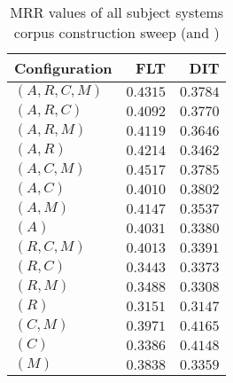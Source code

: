 
\begin{table}
\begin{spacing}{1.2}
\centering
\caption{MRR values of all subject systems corpus construction sweep (\cone and \ctwo)}
\label{table:all_corpus_sweep}
\vspace{0.2em}
\begin{tabular}{lrr}
\toprule
Configuration &           FLT &           DIT \\
\midrule
  $(A,R,C,M)$ &      $0.4315$ &      $0.3784$ \\
    $(A,R,C)$ &      $0.4092$ &      $0.3770$ \\
    $(A,R,M)$ &      $0.4119$ &      $0.3646$ \\
      $(A,R)$ &      $0.4214$ &      $0.3462$ \\
    $(A,C,M)$ & $\bm{0.4517}$ &      $0.3785$ \\
      $(A,C)$ &      $0.4010$ &      $0.3802$ \\
      $(A,M)$ &      $0.4147$ &      $0.3537$ \\
        $(A)$ &      $0.4031$ &      $0.3380$ \\
    $(R,C,M)$ &      $0.4013$ &      $0.3391$ \\
      $(R,C)$ &      $0.3443$ &      $0.3373$ \\
      $(R,M)$ &      $0.3488$ &      $0.3308$ \\
        $(R)$ &      $0.3151$ &      $0.3147$ \\
      $(C,M)$ &      $0.3971$ & $\bm{0.4165}$ \\
        $(C)$ &      $0.3386$ &      $0.4148$ \\
        $(M)$ &      $0.3838$ &      $0.3359$ \\
\bottomrule
\end{tabular}

\end{spacing}
\end{table}

